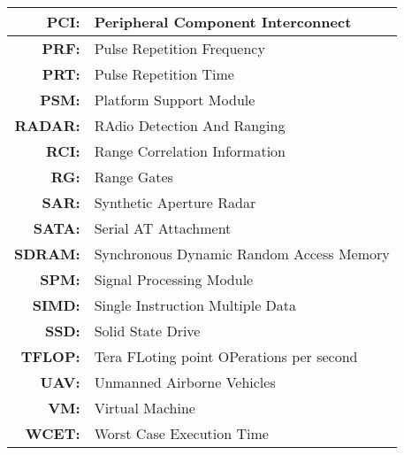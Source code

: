 \begin{center}
\begin{longtable}{|>{\bfseries}rl|}
PCI: & Peripheral Component Interconnect \\ \hline
PRF: & Pulse Repetition Frequency  \\ \hline
PRT: & Pulse Repetition Time \\ \hline
PSM: & Platform Support Module \\ \hline
RADAR: & RAdio Detection And Ranging \\ \hline 
RCI: & Range Correlation Information \\ \hline
RG: & Range Gates \\ \hline
SAR: & Synthetic Aperture Radar \\ \hline
SATA: & Serial AT Attachment \\ \hline
SDRAM: & Synchronous Dynamic Random Access Memory  \\ \hline
SPM: & Signal Processing Module \\ \hline
SIMD: & Single Instruction Multiple Data \\ \hline
SSD: & Solid State Drive \\ \hline
TFLOP: & Tera FLoting point OPerations per second \\ \hline
UAV: & Unmanned Airborne Vehicles \\ \hline 
VM: & Virtual Machine \\ \hline
WCET: &  Worst Case Execution Time \\ \hline

\end{longtable}
\end{center}
